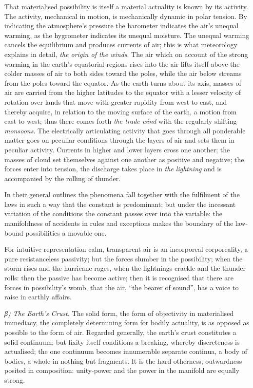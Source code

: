 \documentclass[12pt,a4paper]{book}
\newcommand{\subrunin}[1]{\emph{#1}\hspace{0.4em}}
\begin{document}
That materialised possibility is itself a material actuality is known by its activity. The activity, mechanical in
motion, is mechanically dynamic in polar tension. By indicating the atmosphere's pressure the barometer indicates the
air's unequal warming, as the hygrometer indicates its unequal moisture. The unequal warming cancels the equilibrium and
produces currents of air; this is what meteorology explains in detail, \emph{the origin of the winds}. The air which on
account of the strong warming in the earth's equatorial regions rises into the air lifts itself above the colder masses
of air to both sides toward the poles, while the air below streams from the poles toward the equator. As the earth turns
about its axis, masses of air are carried from the higher latitudes to the equator with a lesser velocity of rotation
over lands that move with greater rapidity from west to east, and thereby acquire, in relation to the moving surface of
the earth, a motion from east to west; thus there comes forth \emph{the trade wind} with the regularly shifting
\emph{monsoons}. The electrically articulating activity that goes through all ponderable matter goes on peculiar
conditions through
the layers of air and sets them in peculiar activity. Currents in higher and lower layers cross one another; the masses
of cloud set themselves against one another as positive and negative; the forces enter into tension, the discharge takes
place in \emph{the lightning} and is accompanied by the rolling of thunder.

In their general outlines the phenomena fall together with the fulfilment of the laws in such a way that the constant is
predominant; but under the incessant variation of the conditions the constant passes over into the variable: the
manifoldness of accidents in rules and exceptions makes the boundary of the law-bound possibilities a movable one.

For intuitive representation calm, transparent air is an incorporeal corporeality, a pure resistanceless passivity;
but the forces slumber in the possibility; when the storm rises and the hurricane rages, when the lightnings crackle and
the thunder rolls: then the passive has become active; then it is recognised that there are forces in possibility's
womb, that the air, ``the bearer of sound'', has a voice to raise in earthly affairs.

\subrunin{β) The Earth's Crust.} The solid form, the form of objectivity in materialised immediacy, the completely
determining form for bodily actuality, is as opposed as possible to the form of air. Regarded generally, the earth's
crust constitutes a solid continuum; but fixity itself conditions a breaking, whereby discreteness is actualised; the one
continuum becomes innumerable separate continua, a body of bodies, a whole in nothing but fragments. It is the hard
otherness, outwardness posited in composition: unity-power and the power in the manifold are equally strong.
\end{document}
